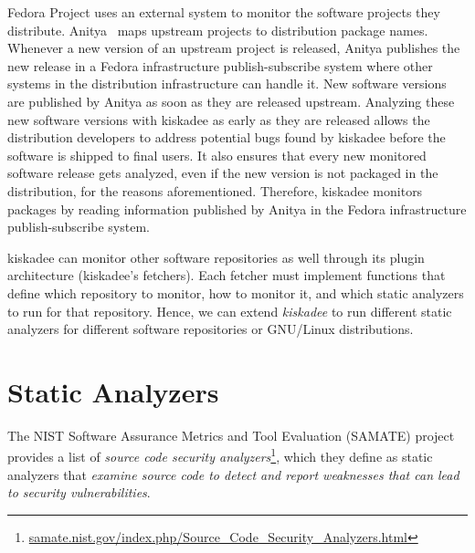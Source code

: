 Fedora Project uses an external system to monitor the software projects they
distribute. Anitya~\cite{anitya} maps upstream projects to distribution package
names. Whenever a new version of an upstream project is released, Anitya
publishes the new release in a Fedora infrastructure publish-subscribe system
where other systems in the distribution infrastructure can handle it. New
software versions are published by Anitya as soon as they are released
upstream. Analyzing these new software versions with kiskadee as early as they
are released allows the distribution developers to address potential bugs found
by kiskadee before the software is shipped to final users. It also ensures that
every new monitored software release gets analyzed, even if the new version is not
packaged in the distribution, for the reasons aforementioned. Therefore,
kiskadee monitors packages by reading information published by Anitya in the
Fedora infrastructure publish-subscribe system.

kiskadee can monitor other software repositories as well through its plugin
architecture (kiskadee's fetchers). Each fetcher must implement functions that
define which repository to monitor, how to monitor it, and which static
analyzers to run for that repository. Hence, we can extend \textit{kiskadee} to
run different static analyzers for different software repositories or GNU/Linux
distributions.

\section{Static Analyzers}
\label{sec:analyzers}

The NIST Software Assurance Metrics and Tool Evaluation (SAMATE) project
provides a list of \textit{source code security
analyzers}\footnote{\url{samate.nist.gov/index.php/Source_Code_Security_Analyzers.html}},
which they define as static analyzers that \textit{examine source code to
detect and report weaknesses that can lead to security vulnerabilities}.


